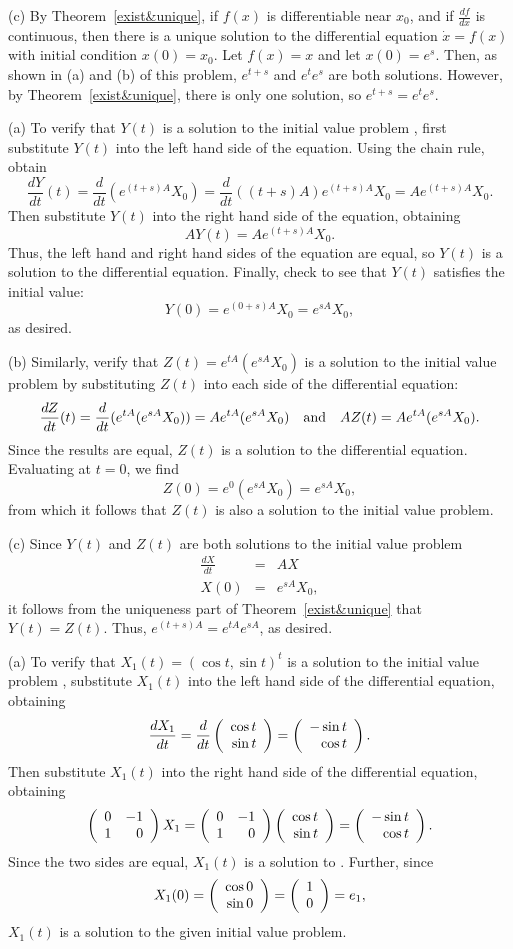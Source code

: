 (c) By Theorem~\ref{exist&unique}, if
$f(x)$ is differentiable near $x_0$, and if $\frac{df}{dx}$ is continuous,
then there is a unique solution to the differential equation $\dot{x} = f(x)$
with initial condition $x(0) = x_0$.  Let $f(x) = x$ and let $x(0) = e^s$.
Then, as shown in (a) and (b) of this problem, $e^{t + s}$ and $e^te^s$ are
both solutions.  However, by Theorem~\ref{exist&unique}, there is only one
solution, so $e^{t + s} = e^te^s$.

(a) To verify that $Y(t)$ is a solution to the initial value problem
, first substitute $Y(t)$ into the left hand side of the
equation.  Using the chain rule, obtain
\[
\frac{dY}{dt}(t) = \frac{d}{dt}(e^{(t + s)A}X_0) =
\frac{d}{dt}((t + s)A)e^{(t + s)A}X_0 = Ae^{(t + s)A}X_0.
\]
Then substitute $Y(t)$ into the right hand side of the equation, obtaining
\[
AY(t) = Ae^{(t + s)A}X_0.
\]
Thus, the left hand and right hand sides of the equation are equal, so
$Y(t)$ is a solution to the differential equation.  Finally, check to see
that $Y(t)$ satisfies the initial value:
\[
Y(0) = e^{(0 + s)A}X_0 = e^{sA}X_0,
\]
as desired.

(b) Similarly, verify that $Z(t) = e^{tA}(e^{sA}X_0)$ is a solution to the
initial value problem by substituting $Z(t)$ into each side of the
differential equation:
\[
\frac{dZ}{dt}(t) = \frac{d}{dt}(e^{tA}(e^{sA}X_0))
= Ae^{tA}(e^{sA}X_0) \quad\mbox{and}\quad
AZ(t) = Ae^{tA}(e^{sA}X_0).
\]
Since the results are equal, $Z(t)$ is a solution to the differential
equation.  Evaluating at $t = 0$, we find
\[
Z(0) = e^{0}(e^{sA}X_0) = e^{sA}X_0,
\]
from which it follows that $Z(t)$ is also a solution to the initial
value problem.

(c) Since $Y(t)$ and $Z(t)$ are both solutions to the initial value problem
\[
\begin{array}{rcl}
\frac{dX}{dt} & = & AX \\
X(0) & = & e^{sA}X_0,
\end{array}
\]
it follows from the uniqueness part of Theorem~\ref{exist&unique} that
$Y(t) = Z(t)$.  Thus, $e^{(t + s)A} = e^{tA}e^{sA}$, as desired.


(a) To verify that $X_1(t) = (\cos t,\sin t)^t$ is a solution to the
initial value problem , substitute $X_1(t)$ into the left
hand side of the differential equation, obtaining
\[
\frac{dX_1}{dt} = \frac{d}{dt}\left(\begin{array}{r} \cos t \\ \sin t\end{array}\right) =
\left(\begin{array}{r} -\sin t \\ \cos t\end{array}\right).
\]
Then substitute $X_1(t)$ into the right hand side of the differential
equation, obtaining
\[
\left(\begin{array}{rr} 0 & -1\\ 1 &0\end{array}\right)X_1 = \left(\begin{array}{rr} 0 & -1\\ 1 &0\end{array}\right)\left(\begin{array}{r} \cos t \\ \sin t\end{array}\right)
= \left(\begin{array}{r} -\sin t \\ \cos t\end{array}\right).
\]
Since the two sides are equal, $X_1(t)$ is a solution to
.  Further, since
\[
X_1(0) = \left(\begin{array}{r} \cos 0 \\ \sin 0\end{array}\right) = \left(\begin{array}{r} 1 \\ 0\end{array}\right) = e_1,
\]
$X_1(t)$ is a solution to the given initial value problem.

